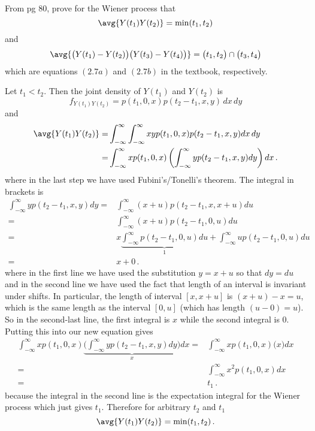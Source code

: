 

From pg 80, prove for the Wiener process that
\begin{equation*}
  \avg{Y(t_1) Y(t_2)} = \min(t_1, t_2)
\end{equation*}
and
\begin{equation*}
  \avg{ \big( Y(t_1) - Y(t_2) \big)  \big( Y(t_3) - Y(t_4) \big) } = \big( t_1, t_2 \big) \cap \big( t_3, t_4 \big)
\end{equation*}
which are equations $(2.7a)$ and $(2.7b)$ in the textbook, respectively.


Let $t_1 < t_2$.
Then the joint density of $Y (t_1)$ and  $Y (t_2)$ is
\begin{equation*}
  f_{Y (t_1)Y(t_2)} = p(t_1, 0, x)p(t_2 - t_1, x, y) \, dx \, dy
\end{equation*}
and
\begin{align*}
  \avg{Y(t_1)Y(t_2)}
  =& \int_{-\infty}^{\infty} \int_{-\infty}^{\infty} x y p(t_1, 0, x) p(t_2 - t_1, x, y) dx \, dy \\
  = & \int_{-\infty}^{\infty} x p(t_1, 0, x) \left( \int_{-\infty}^{\infty} y p(t_2 - t_1, x, y)dy \right) dx
  \, .
\end{align*}
where in the last step we have used Fubini's/Tonelli's theorem.
The integral in brackets is
\begin{align*}
\int_{-\infty}^{\infty} y p(t_2 - t_1, x, y)dy
  = & \int_{-\infty}^{\infty} (x + u) p(t_2 - t_1, x, x + u)du \\
  = & \int_{-\infty}^{\infty} (x + u) p(t_2 - t_1, 0, u)du \\
  = & x \underbrace{ \int_{-\infty}^{\infty} p(t_2 - t_1, 0, u)du }_1 + \int_{-\infty}^{\infty} u p(t_2 - t_1, 0, u)du \\
  = & x + 0
  \, .
\end{align*}
where in the first line we have used the substitution $y = x + u$ so that $dy = du$ and in the second line we have used the fact that length of an interval is invariant under shifts.
In particular, the length of interval $\left[x, x + u  \right]$ is $(x + u) - x = u$, which is the same length as the interval $ \left[ 0, u \right] $ (which has length $(u - 0) = u$).
So in the second-last line, the first integral is $x$ while the second integral is $0$.
Putting this into our new equation gives
\begin{align*}
\int_{-\infty}^{\infty} x p(t_1, 0, x) \underbrace{ \bigg( \int_{-\infty}^{\infty} y p(t_2 - t_1, x, y)dy \bigg) }_x dx
  = & \int_{-\infty}^{\infty} x p(t_1, 0, x) \big( x \big) dx \\
  = & \int_{-\infty}^{\infty} x^2 p(t_1, 0, x) dx\\
  = & t_1
  \, .
\end{align*}
because the integral in the second line is the expectation integral for the Wiener process which just gives $t_1$.
Therefore for arbitrary $t_2$ and $t_1$
\begin{equation*}
  \avg{Y(t_1)Y(t_2)} = \min(t_1, t_2)
  \, .
\end{equation*}

